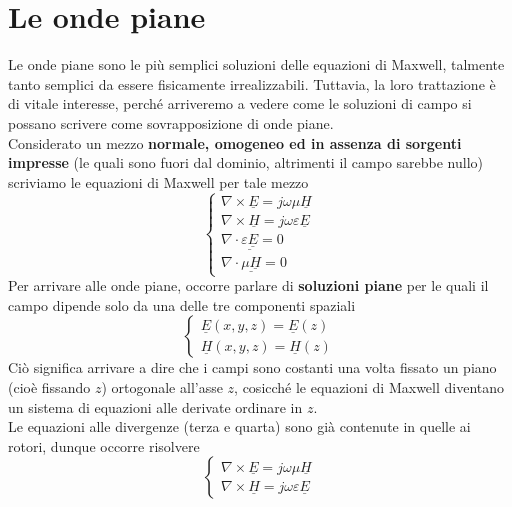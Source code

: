 \documentclass{book}
\begin{document}
    \section{Le onde piane}
    Le onde piane sono le più semplici soluzioni delle equazioni di Maxwell, talmente tanto semplici da essere fisicamente irrealizzabili. Tuttavia, la loro trattazione è di vitale interesse, perché
    arriveremo a vedere come le soluzioni di campo si possano scrivere come sovrapposizione di onde piane. \\
    Considerato un mezzo \textbf{normale, omogeneo ed in assenza di sorgenti impresse} (le quali sono fuori dal dominio, altrimenti il campo sarebbe nullo) scriviamo le equazioni di Maxwell per tale mezzo
    \begin{equation}
        \begin{cases}
            \nabla \times \underline{E} = j\omega \mu \underline{H} \\
            \nabla \times \underline{H} = j\omega \varepsilon \underline{E} \\
            \nabla \cdot \underline{\varepsilon \underline{E}} = 0 \\
            \nabla \cdot \underline{\mu \underline{H}} = 0
        \end{cases}
    \end{equation}
    Per arrivare alle onde piane, occorre parlare di \textbf{soluzioni piane} per le quali il campo dipende solo da una delle tre componenti spaziali
    \begin{equation}
        \begin{cases}
            \underline{E}(x,y,z) = \underline{E}(z) \\
            \underline{H}(x,y,z) = \underline{H}(z)
        \end{cases}
    \end{equation}
    Ciò significa arrivare a dire che i campi sono costanti una volta fissato un piano (cioè fissando $z$) ortogonale all'asse $z$, cosicché le equazioni di Maxwell diventano un sistema di equazioni alle derivate ordinare in $z$.
    \\ Le equazioni alle divergenze (terza e quarta) sono già contenute in quelle ai rotori, dunque occorre risolvere
    \begin{equation}
        \begin{cases}
            \nabla \times \underline{E} = j\omega \mu \underline{H} \\
            \nabla \times \underline{H} = j\omega \varepsilon \underline{E}
        \end{cases}
    \end{equation}
\end{document}
